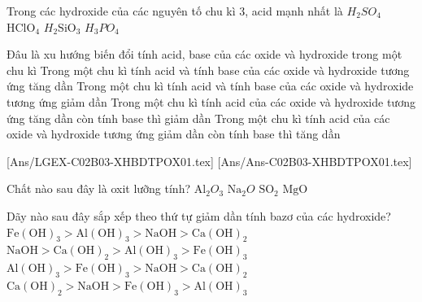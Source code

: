 \begin{vdex}
	Trong các hydroxide của các nguyên tố chu kì 3, acid mạnh nhất là
	\choice
	{$H_2SO_4$}
	{\True $\mathrm{HClO}_4$}
	{$H_2\mathrm{SiO}_3$}
	{$H_3PO_4$}
\end{vdex}
\begin{vdex}
	Đâu là xu hướng biến đổi tính acid, base của các oxide và hydroxide trong một chu kì
	\choice
	{Trong một chu kì tính acid và tính base của các oxide và hydroxide tương ứng tăng dần }
	{Trong một chu kì tính acid và tính base của các oxide và hydroxide tương ứng giảm dần }
	{\True Trong một chu kì tính acid của các oxide và hydroxide tương ứng tăng dần còn tính base thì giảm dần }
	{Trong một chu kì tính acid của các oxide và hydroxide tương ứng giảm dần còn tính base thì tăng dần }
\end{vdex}
[Ans/LGEX-C02B03-XHBDTPOX01.tex]
[Ans/Ans-C02B03-XHBDTPOX01.tex]
\begin{ex}%
	Chất nào sau đây là oxit lưỡng tính?
	\choice
	{\True $\mathrm{Al}_2O_3$}
	{$\mathrm{Na}_2O$}
	{$\mathrm{SO}_2$}
	{$\mathrm{MgO}$}
\end{ex}
\begin{ex}%
	Dãy nào sau đây sắp xếp theo thứ tự giảm dần tính bazơ của các hydroxide?
	\choice
	{$\mathrm{Fe(OH)}_3 > \mathrm{Al(OH)}_3 > \mathrm{NaOH} > \mathrm{Ca(OH)}_2$}
	{\True $\mathrm{NaOH} > \mathrm{Ca(OH)}_2 > \mathrm{Al(OH)}_3 > \mathrm{Fe(OH)}_3$}
	{$\mathrm{Al(OH)}_3 > \mathrm{Fe(OH)}_3 > \mathrm{NaOH} > \mathrm{Ca(OH)}_2$}
	{$\mathrm{Ca(OH)}_2 > \mathrm{NaOH} > \mathrm{Fe(OH)}_3 > \mathrm{Al(OH)}_3$}
\end{ex}
